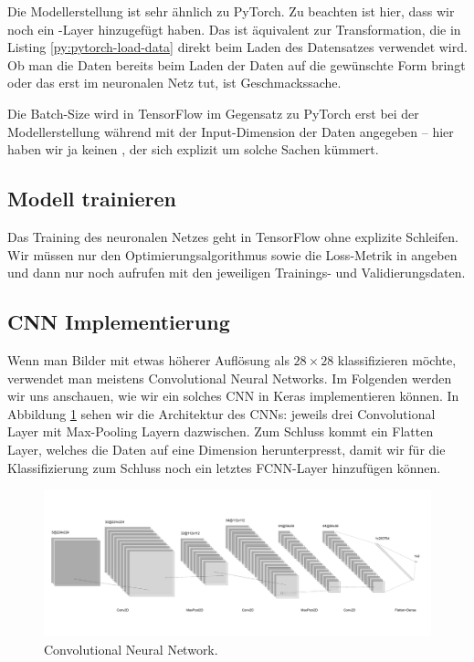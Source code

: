 Die Modellerstellung ist sehr ähnlich zu PyTorch. Zu beachten ist hier, dass 
wir noch ein -Layer hinzugefügt haben. Das ist äquivalent zur 
 Transformation, die in Listing \ref{py:pytorch-load-data} direkt beim 
Laden des Datensatzes verwendet wird. 
Ob man die Daten bereits beim Laden der Daten auf die gewünschte Form bringt oder das 
erst im neuronalen Netz tut, ist Geschmackssache. 

Die Batch-Size wird in TensorFlow im Gegensatz zu PyTorch erst bei der Modellerstellung 
während  mit der Input-Dimension der Daten angegeben -- hier haben wir ja 
keinen , der sich explizit um solche Sachen kümmert.

\subsection{Modell trainieren}



Das Training des neuronalen Netzes geht in TensorFlow ohne explizite Schleifen. 
Wir müssen nur den Optimierungsalgorithmus sowie die Loss-Metrik in  
angeben und dann nur noch  aufrufen mit den jeweiligen Trainings- und 
Validierungsdaten. 


\subsection{CNN Implementierung}

Wenn man Bilder mit etwas höherer Auflösung als \(28\times 28\) klassifizieren möchte, verwendet man 
meistens Convolutional Neural Networks. Im Folgenden werden wir uns anschauen, wie wir ein solches CNN in Keras 
implementieren können. In Abbildung \ref{fig:cnn} sehen wir die Architektur des CNNs: jeweils drei Convolutional Layer 
mit Max-Pooling Layern dazwischen. Zum Schluss kommt ein Flatten Layer, welches die Daten auf eine Dimension herunterpresst, 
damit wir für die Klassifizierung zum Schluss noch ein letztes FCNN-Layer hinzufügen können. 

\begin{figure}[htbp]
    \centering
    \includegraphics[width=.9\textwidth]{figures/cnn}
    \caption{Convolutional Neural Network.}
    \label{fig:cnn}
\end{figure}

